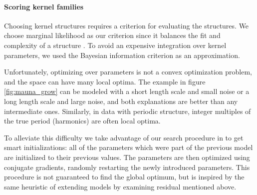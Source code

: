 \documentclass[twoside]{article}
\begin{document}
\paragraph{Scoring kernel families}

Choosing kernel structures requires a criterion for evaluating the structures.
We choose marginal likelihood as our criterion since it balances the fit and complexity of a structure \citep[e.g.][]{rasmussen2001occam}.
To avoid an expensive integration over kernel parameters, we used the Bayesian information criterion \citep{schwarz1978estimating} as an approximation.

Unfortunately, optimizing over parameters is not a convex optimization problem, and the space can have many local optima.
The example in figure \ref{fig:mauna_grow} can be modeled with a short length scale and small noise or a long length scale and large noise, and both explanations are better than any intermediate ones.
Similarly, in data with periodic structure, integer multiples of the true period (\ie harmonics) are often local optima. 

To alleviate this difficulty we take advantage of our search procedure in to get smart initializations: all of the parameters which were part of the previous model are initialized to their previous values.
The parameters are then optimized using conjugate gradients, randomly restarting the newly introduced parameters.
This procedure is not guaranteed to find the global optimum, but is inspired by the same heuristic of extending models by examining residual mentioned above.
\end{document}
